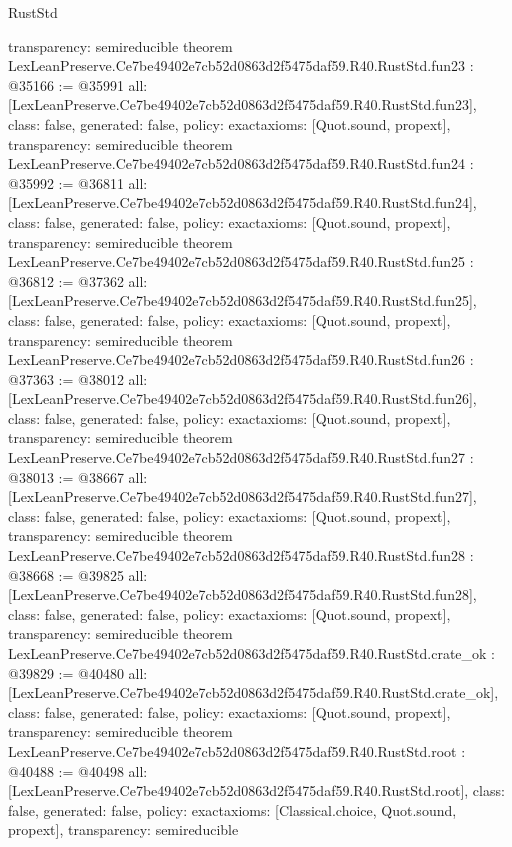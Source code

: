 \begin{lexlean}{RustStd}
\begin{coremodule}
{  transparency: semireducible
}
theorem LexLeanPreserve.Ce7be49402e7cb52d0863d2f5475daf59.R40.RustStd.fun23 : @35166 := @35991 {
  all: [LexLeanPreserve.Ce7be49402e7cb52d0863d2f5475daf59.R40.RustStd.fun23],
  class: false,
  generated: false,
  policy: exact{axioms: [Quot.sound, propext]},
  transparency: semireducible
}
theorem LexLeanPreserve.Ce7be49402e7cb52d0863d2f5475daf59.R40.RustStd.fun24 : @35992 := @36811 {
  all: [LexLeanPreserve.Ce7be49402e7cb52d0863d2f5475daf59.R40.RustStd.fun24],
  class: false,
  generated: false,
  policy: exact{axioms: [Quot.sound, propext]},
  transparency: semireducible
}
theorem LexLeanPreserve.Ce7be49402e7cb52d0863d2f5475daf59.R40.RustStd.fun25 : @36812 := @37362 {
  all: [LexLeanPreserve.Ce7be49402e7cb52d0863d2f5475daf59.R40.RustStd.fun25],
  class: false,
  generated: false,
  policy: exact{axioms: [Quot.sound, propext]},
  transparency: semireducible
}
theorem LexLeanPreserve.Ce7be49402e7cb52d0863d2f5475daf59.R40.RustStd.fun26 : @37363 := @38012 {
  all: [LexLeanPreserve.Ce7be49402e7cb52d0863d2f5475daf59.R40.RustStd.fun26],
  class: false,
  generated: false,
  policy: exact{axioms: [Quot.sound, propext]},
  transparency: semireducible
}
theorem LexLeanPreserve.Ce7be49402e7cb52d0863d2f5475daf59.R40.RustStd.fun27 : @38013 := @38667 {
  all: [LexLeanPreserve.Ce7be49402e7cb52d0863d2f5475daf59.R40.RustStd.fun27],
  class: false,
  generated: false,
  policy: exact{axioms: [Quot.sound, propext]},
  transparency: semireducible
}
theorem LexLeanPreserve.Ce7be49402e7cb52d0863d2f5475daf59.R40.RustStd.fun28 : @38668 := @39825 {
  all: [LexLeanPreserve.Ce7be49402e7cb52d0863d2f5475daf59.R40.RustStd.fun28],
  class: false,
  generated: false,
  policy: exact{axioms: [Quot.sound, propext]},
  transparency: semireducible
}
theorem LexLeanPreserve.Ce7be49402e7cb52d0863d2f5475daf59.R40.RustStd.crate_ok : @39829 := @40480 {
  all: [LexLeanPreserve.Ce7be49402e7cb52d0863d2f5475daf59.R40.RustStd.crate_ok],
  class: false,
  generated: false,
  policy: exact{axioms: [Quot.sound, propext]},
  transparency: semireducible
}
theorem LexLeanPreserve.Ce7be49402e7cb52d0863d2f5475daf59.R40.RustStd.root : @40488 := @40498 {
  all: [LexLeanPreserve.Ce7be49402e7cb52d0863d2f5475daf59.R40.RustStd.root],
  class: false,
  generated: false,
  policy: exact{axioms: [Classical.choice, Quot.sound, propext]},
  transparency: semireducible
}


\end{coremodule}
\end{lexlean}
